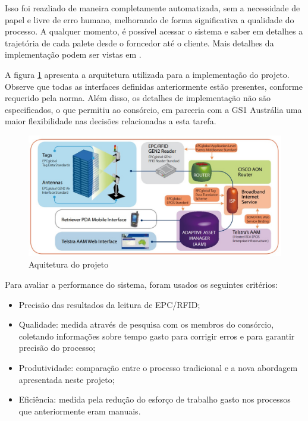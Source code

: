	Isso foi reazliado de maneira completamente automatizada, sem a necessidade de papel e livre de erro humano, melhorando de forma significativa a qualidade do processo. A qualquer momento, é possível acessar o sistema e saber em detalhes a trajetória de cada palete desde o forncedor até o cliente. Mais detalhes da implementação podem ser vistas em \cite{case_epc_demo_ext}.
	
	
	A figura \ref{fig:ausarq} apresenta a arquitetura utilizada para a implementação do projeto. Observe que todas as interfaces definidas anteriormente estão presentes, conforme requerido pela norma. Além disso, os detalhes de implementação não são especificados, o que permitiu ao consórcio, em parceria com a GS1 Austrália uma maior flexibilidade nas decisões relacionadas a esta tarefa.
	
	\begin{figure}[h!]
		\centering
		\includegraphics[width=0.7\linewidth]{ausarq}
		\caption{Aquitetura do projeto}
		\label{fig:ausarq}
	\end{figure}
	
	Para avaliar a performance do sistema, foram usados os seguintes critérios:
	\begin{itemize}
		\item Precisão das resultados da leitura de EPC/RFID;
		\item Qualidade: medida através de pesquisa com os membros do consórcio, coletando informações sobre tempo gasto para corrigir erros e para garantir precisão do processo;
		\item Produtividade: comparação entre o processo tradicional e a nova abordagem apresentada neste projeto;
		\item Eficiência: medida pela redução do esforço de trabalho gasto nos processos que anteriormente eram manuais.
	\end{itemize}
	
